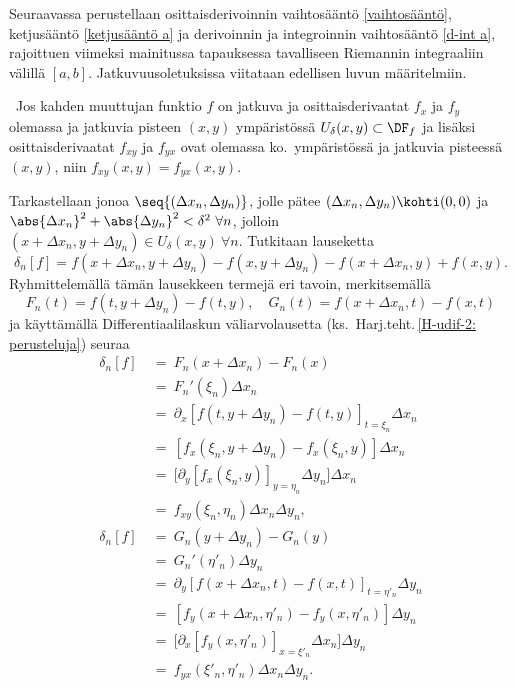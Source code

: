 Seuraavassa perustellaan osittaisderivoinnin vaihtosääntö \eqref{vaihtosääntö}, ketjusääntö
\eqref{ketjusääntö a} ja derivoinnin ja integroinnin vaihtosääntö \eqref{d-int a}, rajoittuen
viimeksi mainitussa tapauksessa tavalliseen Riemannin integraaliin välillä $[a,b]$.
Jatkuvuusoletuksissa viitataan edellisen luvun määritelmiin.
\begin{Lause} \label{osittaisderivoinnin vaihtosääntö}
 \ Jos kahden muuttujan funktio $f$ on jatkuva ja
osittaisderivaatat $f_x$ ja $f_y$ olemassa ja jatkuvia pisteen $(x,y)$ ympäristössä
$U_\delta(x,y)\subset\DF_f$ ja lisäksi osittaisderivaatat $f_{xy}$ ja $f_{yx}$ ovat olemassa
ko.\ ympäristössä ja jatkuvia pisteessä $(x,y)$, niin $f_{xy}(x,y)=f_{yx}(x,y)$. 
\end{Lause}
\tod Tarkastellaan jonoa $\seq{(\Delta x_n,\Delta y_n)}$, jolle pätee
$(\Delta x_n,\Delta y_n)\kohti(0,0)$ ja
$\abs{\Delta x_n}^2+\abs{\Delta y_n}^2 < \delta^2\ \forall n$, jolloin
$(x+\Delta x_n,y+\Delta y_n) \in U_\delta(x,y)\ \forall n$. Tutkitaan lauseketta
\[
\delta_n[f]=f(x+\Delta x_n,y+\Delta y_n)-f(x,y+\Delta y_n)-f(x+\Delta x_n,y)+f(x,y).
\] 
Ryhmittelemällä tämän lausekkeen termejä eri tavoin, merkitsemällä
\[
F_n(t)=f(t,y+\Delta y_n)-f(t,y), \quad G_n(t)=f(x+\Delta x_n,t)-f(x,t)
\]
ja käyttämällä Differentiaalilaskun väliarvolausetta
(ks.\ Harj.teht.\,\ref{H-udif-2: perusteluja}) seuraa
\begin{align*}
\delta_n[f]\ &=\ F_n(x+\Delta x_n)-F_n(x) \\
             &=\ F_n'(\xi_n)\Delta x_n \\
             &=\ \partial_x [f(t,y+\Delta y_n)-f(t,y)]_{t=\xi_n}\Delta x_n \\
             &=\ [f_x(\xi_n,y+\Delta y_n)-f_x(\xi_n,y)]\Delta x_n \\
             &=\ \bigl[\partial_y [f_x(\xi_n,y)]_{y=\eta_n}\Delta y_n\bigr]\Delta x_n \\
             &=\ f_{xy}(\xi_n,\eta_n)\Delta x_n\Delta y_n, \\[2mm]
\delta_n[f]\ &=\ G_n(y+\Delta y_n)-G_n(y) \\
             &=\ G_n'(\eta'_n)\Delta y_n \\
             &=\ \partial_y [f(x+\Delta x_n,t)-f(x,t)]_{t=\eta'_n}\Delta y_n \\
             &=\ [f_y(x+\Delta x_n,\eta'_n)-f_y(x,\eta'_n)]\Delta y_n \\
             &=\ \bigl[\partial_x [f_y(x,\eta'_n)]_{x=\xi'_n}\Delta x_n\bigr]\Delta y_n \\
             &=\ f_{yx}(\xi'_n,\eta'_n)\Delta x_n\Delta y_n.
\end{align*}
